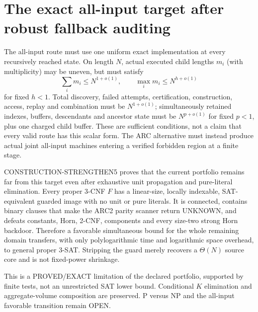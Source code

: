 \section{The exact all-input target after robust fallback auditing}
The all-input route must use one uniform exact implementation at every
recursively reached state. On length $N$, actual executed child lengths
$m_i$ (with multiplicity) may be uneven, but must satisfy
\[
 \sum_i m_i\le N^{1+o(1)},\qquad
 \max_i m_i\le N^{h+o(1)}
\]
for fixed $h<1$. Total discovery, failed attempts, certification,
construction, access, replay and combination must be $N^{1+o(1)}$;
simultaneously retained indexes, buffers, descendants and ancestor state
must be $N^{p+o(1)}$ for fixed $p<1$, plus one charged child buffer.
These are sufficient conditions, not a claim that every valid route has
this scalar form. The ARC alternative must instead produce actual joint
all-input machines entering a verified forbidden region at a finite stage.

CONSTRUCTION-STRENGTHEN5 proves that the current portfolio remains far
from this target even after exhaustive unit propagation and pure-literal
elimination. Every proper 3-CNF $F$ has a linear-size, locally indexable,
SAT-equivalent guarded image with no unit or pure literals. It is connected,
contains binary clauses that make the ARC2 parity scanner return UNKNOWN,
and defeats constants, Horn, 2-CNF, components and every size-two strong
Horn backdoor. Therefore a favorable simultaneous bound for the whole
remaining domain transfers, with only polylogarithmic time and logarithmic
space overhead, to general proper 3-SAT. Stripping the guard merely recovers
a $\Theta(N)$ source core and is not fixed-power shrinkage.

This is a PROVED/EXACT limitation of the declared portfolio, supported by
finite tests, not an unrestricted SAT lower bound. Conditional $K$
elimination and aggregate-volume composition are preserved. P versus NP
and the all-input favorable transition remain OPEN.
